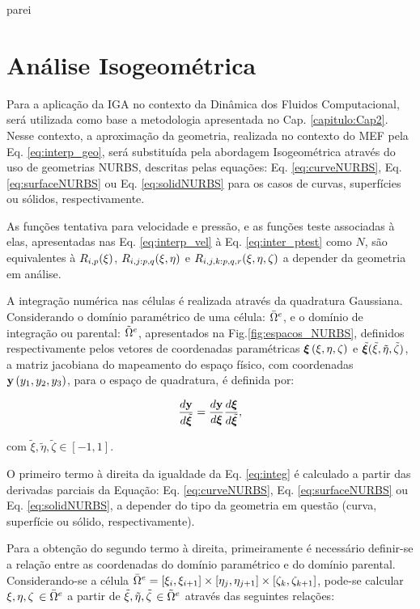 \documentclass[tese_patricia]{subfiles}
\begin{document}
parei \aquiiiiii
\section{Análise Isogeométrica}\label{capitulo:Cap3:IGA}


Para a aplicação da IGA no contexto da Dinâmica dos Fluidos Computacional, será utilizada como base a metodologia apresentada no Cap. \ref{capitulo:Cap2}. Nesse contexto, a aproximação da geometria, realizada no contexto do MEF pela Eq. \ref{eq:interp_geo}, será substituída pela abordagem Isogeométrica através do uso de geometrias NURBS, descritas pelas equações: Eq. \ref{eq:curveNURBS}, Eq. \ref{eq:surfaceNURBS} ou Eq. \ref{eq:solidNURBS} para os casos de curvas, superfícies ou sólidos, respectivamente.

As funções tentativa para velocidade e pressão, e as funções teste associadas à elas, apresentadas nas Eq. \eqref{eq:interp_vel} à Eq. \eqref{eq:inter_ptest} como $N$, são equivalentes à $R_{i,p}(\xi)$, $R_{i,j:p,q}(\xi,\eta)$ e $R_{i,j,k:p,q,r}(\xi,\eta,\zeta)$ a depender da geometria em análise.

A integração numérica nas células é realizada através da quadratura Gaussiana. Considerando o domínio paramétrico de uma célula: $\bar{\Omega}^{e}$, e o domínio de integração ou parental: $\tilde{\Omega}^{e}$, apresentados na Fig.\ref{fig:espacos_NURBS}, definidos respectivamente pelos vetores de coordenadas paramétricas $\bm{\xi}\left(\xi,\eta,\zeta\right)$ e $\tilde{\bm{\xi}}(\tilde{\xi},\tilde{\eta},\tilde{\zeta})$, a matriz jacobiana do mapeamento do espaço físico, com coordenadas $\mathbf{y} \left(y_1,y_2,y_3\right)$,  para o espaço de quadratura, é definida por:

\begin{align}
\frac{d\mathbf{y}}{d\tilde{\bm{\xi}}} = \frac{d\mathbf{y}}{d\bm{\xi}} \frac{d\bm{\xi}}{d\tilde{\bm{\xi}}}, \label{eq:integ}
\end{align} 

\noindent com $\tilde{\xi}, \tilde{\eta}, \tilde{\zeta} \in [-1, 1]$.

O primeiro termo à direita da igualdade da Eq. \eqref{eq:integ} é calculado a partir das derivadas parciais da Equação: Eq. \eqref{eq:curveNURBS}, Eq. \eqref{eq:surfaceNURBS} ou Eq. \eqref{eq:solidNURBS}, a depender do tipo da geometria em questão (curva, superfície ou sólido, respectivamente).

Para a obtenção do segundo termo à direita, primeiramente é necessário definir-se a relação entre as coordenadas  do domínio paramétrico e do domínio parental. Considerando-se a célula $\bar{\Omega}^{e} = [\xi_{i},\xi_{i+1}] \times [\eta_{j},\eta_{j+1}] \times [\zeta_{k},\zeta_{k+1}]$, pode-se calcular $\xi,\eta, \zeta$ $\in \bar{\Omega}^{e}$ a partir de $\tilde{\xi},\tilde{\eta}, \tilde{\zeta}$ $\in \tilde{\Omega}^{e}$ através das seguintes relações: 
\end{document}
